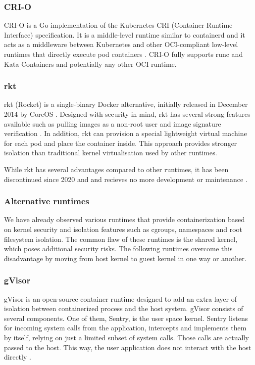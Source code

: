 \subsubsection*{CRI-O}

CRI-O is a Go implementation of the Kubernetes CRI (Container Runtime Interface) specification. It is a middle-level runtime similar to containerd and it acts as a middleware between Kubernetes and other OCI-compliant low-level runtimes that directly execute pod containers \cite{c:4}. CRI-O fully supports runc and Kata Containers and potentially any other OCI runtime.

\subsubsection*{rkt}

rkt (Rocket) is a single-binary Docker alternative, initially released in December 2014 by CoreOS \cite{c:9}. Designed with security in mind, rkt has several strong features available such as pulling images as a non-root user and image signature verification \cite{c:10}. In addition, rkt can provision a special lightweight virtual machine for each pod and place the container inside. This approach provides stronger isolation than traditional kernel virtualisation used by other runtimes.

While rkt has several advantages compared to other runtimes, it has been discontinued since 2020 and and recieves no more development or maintenance \cite{gh:rkt}.


\clearpage
\subsubsection{Alternative runtimes}

We have already observed various runtimes that provide containerization based on kernel security and isolation features such as cgroups, namespaces and root filesystem isolation. The common flaw of these runtimes is the shared kernel, which poses additional security risks. The following runtimes overcome this disadvantage by moving from host kernel to guest kernel in one way or another.

\subsubsection*{gVisor}

gVisor is an open-source container runtime designed to add an extra layer of isolation between containerized process and the host system. gVisor consists of several components. One of them, Sentry, is the user space kernel. Sentry listens for incoming system calls from the application, intercepts and implements them by itself, relying on just a limited subset of system calls. Those calls are actually passed to the host. This way, the user application does not interact with the host directly \cite{acm:3}.

